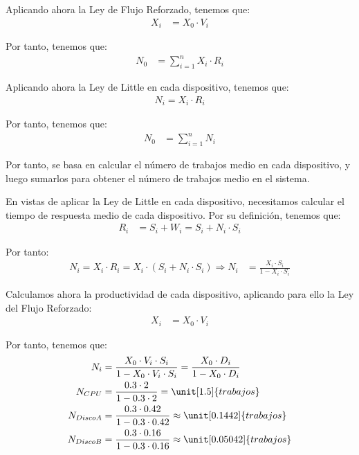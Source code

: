 \documentclass[12pt]{article}
\begin{document}
\begin{ejercicio}[2 puntos]
\begin{enumerate}
            Aplicando ahora la Ley de Flujo Reforzado, tenemos que:
            \begin{align*}
                X_i &= X_0\cdot V_i
            \end{align*}

            Por tanto, tenemos que:
            \begin{align*}
                N_0 &= \sum_{i=1}^{n} X_i\cdot R_i
            \end{align*}

            Aplicando ahora la Ley de Little en cada dispositivo, tenemos que:
            \begin{align*}
                N_i = X_i\cdot R_i
            \end{align*}

            Por tanto, tenemos que:
            \begin{align*}
                N_0 &= \sum_{i=1}^{n} N_i
            \end{align*}

            Por tanto, se basa en calcular el número de trabajos medio en cada dispositivo, y luego sumarlos para obtener el número de trabajos medio en el sistema.

            En vistas de aplicar la Ley de Little en cada dispositivo, necesitamos calcular el tiempo de respuesta medio de cada dispositivo. Por su definición, tenemos que:
            \begin{align*}
                R_i &= S_i + W_i = S_i + N_i\cdot S_i
            \end{align*}

            Por tanto:
            \begin{align*}
                N_i = X_i\cdot R_i
                = X_i\cdot (S_i + N_i\cdot S_i)
                \Longrightarrow N_i &= \frac{X_i\cdot S_i}{1 - X_i\cdot S_i}
            \end{align*}

            Calculamos ahora la productividad de cada dispositivo, aplicando para ello la Ley del Flujo Reforzado:
            \begin{align*}
                X_i &= X_0\cdot V_i
            \end{align*}

            Por tanto, tenemos que:
            \begin{align*}
                N_{i} &= \frac{X_0\cdot V_i\cdot S_i}{1 - X_0\cdot V_i\cdot S_i} = \frac{X_0\cdot D_i}{1 - X_0\cdot D_i}\\
                N_{CPU} &= \frac{0.3\cdot 2}{1 - 0.3\cdot 2} = \unit[1.5]{trabajos}\\
                N_{Disco A} &= \frac{0.3\cdot 0.42}{1 - 0.3\cdot 0.42} \approx \unit[0.1442]{trabajos}\\
                N_{Disco B} &= \frac{0.3\cdot 0.16}{1 - 0.3\cdot 0.16} \approx \unit[0.05042]{trabajos}
            \end{align*}


\end{enumerate}
\end{ejercicio}
\end{document}
